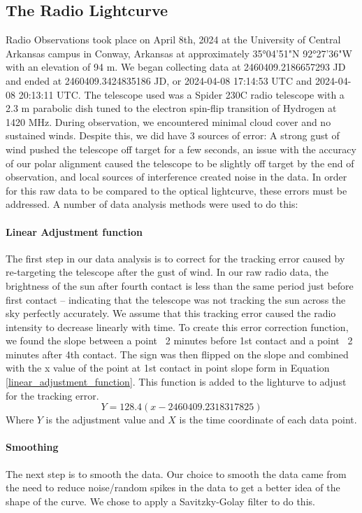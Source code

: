 \subsection{\label{sec:radio}The Radio Lightcurve}
Radio Observations took place on April 8th, 2024 at the University of Central Arkansas campus in Conway, Arkansas at approximately 35°04'51"N 92°27'36"W with an elevation of 94 m.
We began collecting data at 2460409.2186657293 JD and ended at 2460409.3424835186 JD, or 2024-04-08 17:14:53 UTC and 2024-04-08 20:13:11 UTC.
The telescope used was a Spider 230C radio telescope with a 2.3 m parabolic dish tuned to the electron spin-flip transition of Hydrogen at 1420 MHz.
During observation, we encountered minimal cloud cover and no sustained winds.
Despite this, we did have 3 sources of error: A strong gust of wind pushed the telescope off target for a few seconds, an issue with the accuracy of our polar alignment caused the telescope to be slightly off target by the end of observation, and local sources of interference created noise in the data.
In order for this raw data to be compared to the optical lightcurve, these errors must be addressed.
A number of data analysis methods were used to do this:
\paragraph{Linear Adjustment function}
The first step in our data analysis is to correct for the tracking error caused by re-targeting the telescope after the gust of wind.
In our raw radio data, the brightness of the sun after fourth contact is less than the same period just before first contact -- indicating that the telescope was not tracking the sun across the sky perfectly accurately.
We assume that this tracking error caused the radio intensity to decrease linearly with time.
To create this error correction function, we found the slope between a point ~2 minutes before 1st contact and a point ~2 minutes after 4th contact. 
The sign was then flipped on the slope and combined with the x value of the point at 1st contact in point slope form in Equation \ref{linear_adjustment_function}.
This function is added to the lighturve to adjust for the tracking error.
\begin{equation}\label{linear_adjustment_function}
Y = 128.4(x-2460409.2318317825)
\end{equation}
Where $Y$ is the adjustment value and $X$ is the time coordinate of each data point. 
\paragraph{Smoothing}
The next step is to smooth the data.
Our choice to smooth the data came from the need to reduce noise/random spikes in the data to get a better idea of the shape of the curve.
We chose to apply a Savitzky-Golay filter \cite{savitzky_golay_1964} to do this.
